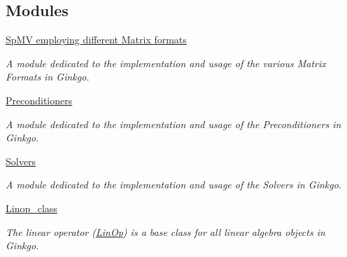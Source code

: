 \subsection*{Modules}
\begin{DoxyCompactItemize}
\item 
\hyperlink{group__mat__formats}{Sp\+M\+V employing different Matrix formats}
\begin{DoxyCompactList}\small\item\em A module dedicated to the implementation and usage of the various Matrix Formats in Ginkgo. \end{DoxyCompactList}\item 
\hyperlink{group__precond}{Preconditioners}
\begin{DoxyCompactList}\small\item\em A module dedicated to the implementation and usage of the Preconditioners in Ginkgo. \end{DoxyCompactList}\item 
\hyperlink{group__solvers}{Solvers}
\begin{DoxyCompactList}\small\item\em A module dedicated to the implementation and usage of the Solvers in Ginkgo. \end{DoxyCompactList}\item 
\hyperlink{group__linop__class}{Linop\+\_\+class}
\begin{DoxyCompactList}\small\item\em The linear operator (\hyperlink{classgko_1_1LinOp}{Lin\+Op}) is a base class for all linear algebra objects in Ginkgo. \end{DoxyCompactList}\end{DoxyCompactItemize}
